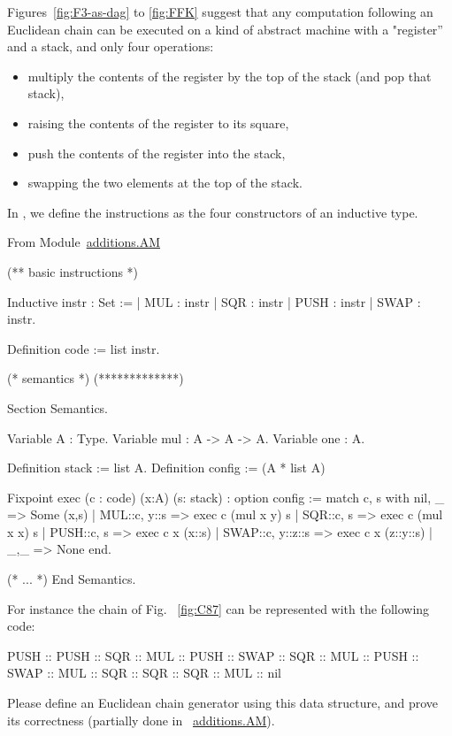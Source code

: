 \begin{project}
Figures~\vref{fig:F3-as-dag} to \vref{fig:FFK} suggest that any computation following an Euclidean chain can be executed on a kind  of abstract machine with a "register'' and a stack, and only four operations:
\begin{itemize}
\item multiply the contents of the register by the top of the stack (and pop that stack),
\item raising the contents of the register to its square,
\item push the contents of the register into the stack,
\item swapping the two elements at the top of the stack.
\end{itemize}

In \coq{}, we define the instructions as the four constructors of an inductive type.

From Module~\href{../theories/html/hydras.additions.AM.html}{additions.AM}

\begin{Coqsrc}
(** basic instructions *)

Inductive instr : Set :=
  | MUL : instr
  | SQR : instr
  | PUSH : instr
  | SWAP : instr.       

Definition code := list instr.

(* semantics *)
(*************)

Section Semantics.

 Variable A : Type.
 Variable mul : A -> A -> A.
 Variable one : A.

 Definition stack := list A.
 Definition config := (A * list A)%

 Fixpoint exec (c : code) (x:A) (s: stack) : option config :=
   match c, s with
     nil, _ => Some (x,s)
   | MUL::c, y::s => exec c (mul x y) s
   | SQR::c, s => exec c (mul x x) s
   | PUSH::c, s => exec c x (x::s)
   | SWAP::c, y::z::s => exec c x (z::y::s)
   | _,_ => None
   end.

(* ... *)
End Semantics.
\end{Coqsrc}

For instance the chain of Fig.~ \vref{fig:C87} can be represented with the following code:

\begin{Coqsrc}
  PUSH :: PUSH :: SQR  :: MUL :: PUSH :: SWAP :: SQR :: MUL :: PUSH
            :: SWAP :: MUL :: SQR :: SQR :: SQR :: MUL :: nil 
\end{Coqsrc}



Please define an Euclidean chain generator using this data structure, and prove its correctness (partially done  in ~\href{../theories/html/hydras.additions.AM.html}{additions.AM}).
\end{project}

